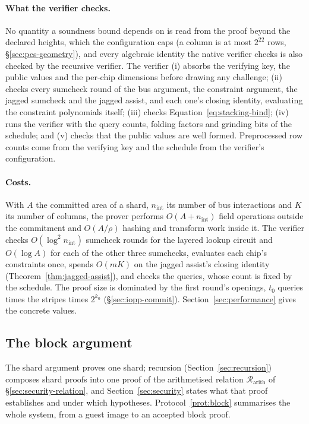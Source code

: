 \paragraph{What the verifier checks.} No quantity a soundness bound depends on is read from the proof beyond the declared heights, which the configuration caps (a column is at most $2^{22}$ rows, \S\ref{sec:pcs-geometry}), and every algebraic identity the native verifier checks is also checked by the recursive verifier. The verifier (i) absorbs the verifying key, the public values and the per-chip dimensions before drawing any challenge; (ii) checks every sumcheck round of the bus argument, the constraint argument, the jagged sumcheck and the jagged assist, and each one's closing identity, evaluating the constraint polynomials itself; (iii) checks Equation~\eqref{eq:stacking-bind}; (iv) runs the \WHIR{} verifier with the query counts, folding factors and grinding bits of the schedule; and (v) checks that the public values are well formed. Preprocessed row counts come from the verifying key and the schedule from the verifier's configuration.

\paragraph{Costs.} With $A$ the committed area of a shard, $n_{\mathrm{int}}$ its number of bus interactions and $K$ its number of columns, the prover performs $O(A + n_{\mathrm{int}})$ field operations outside the commitment and $O(A/\rho)$ hashing and transform work inside it. The verifier checks $O(\log^2 n_{\mathrm{int}})$ sumcheck rounds for the layered lookup circuit and $O(\log A)$ for each of the other three sumchecks, evaluates each chip's constraints once, spends $O(mK)$ on the jagged assist's closing identity (Theorem~\ref{thm:jagged-assist}), and checks the \WHIR{} queries, whose count is fixed by the schedule. The proof size is dominated by the first \WHIR{} round's openings, $t_0$ queries times the stripes times $2^{k_0}$ (\S\ref{sec:iopp-commit}). Section~\ref{sec:performance} gives the concrete values.

\subsection{The block argument}
\label{sec:argument-block}

The shard argument proves one shard; recursion (Section~\ref{sec:recursion}) composes shard proofs into one proof of the arithmetised relation $\mathcal R_{\mathrm{arith}}$ of \S\ref{sec:security-relation}, and Section~\ref{sec:security} states what that proof establishes and under which hypotheses. Protocol~\ref{prot:block} summarises the whole system, from a guest image to an accepted block proof.

